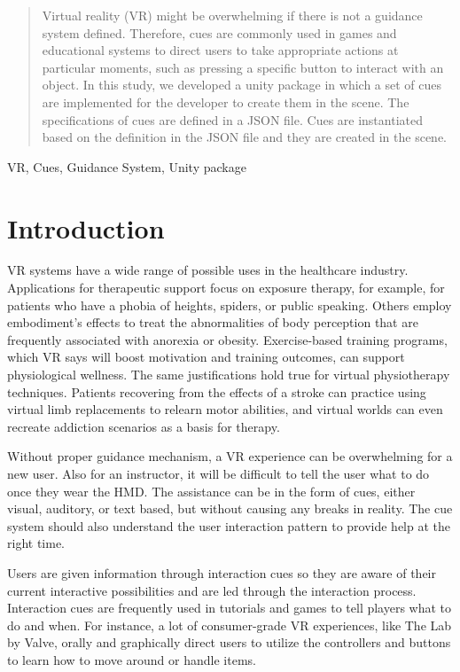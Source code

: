 \documentclass[conference]{IEEEtran}
\begin{document}
\begin{abstract}

Virtual reality (VR) might be overwhelming if there is not a guidance system defined. Therefore, cues are commonly used in games and educational systems to direct users to take appropriate actions at particular moments, such as pressing a specific button to interact with an object. In this study, we developed a unity package in which a set of cues are implemented for the developer to create them in the scene. The specifications of cues are defined in a JSON file. Cues are instantiated based on the definition in the JSON file and they are created in the scene. 


\end{abstract}

\begin{IEEEkeywords}
VR, Cues, Guidance System, Unity package
\end{IEEEkeywords}

\section{Introduction}

VR systems have a wide range of possible uses in the healthcare industry. Applications for therapeutic support focus on exposure therapy, for example, for patients who have a phobia of heights, spiders, or public speaking. Others employ embodiment's effects to treat the abnormalities of body perception that are frequently associated with anorexia or obesity. Exercise-based training programs, which VR says will boost motivation and training outcomes, can support physiological wellness. The same justifications hold true for virtual physiotherapy techniques. Patients recovering from the effects of a stroke can practice using virtual limb replacements to relearn motor abilities, and virtual worlds can even recreate addiction scenarios as a basis for therapy.

Without proper guidance mechanism, a VR experience can be overwhelming for a new user. Also for an instructor, it will be difficult to tell the user what to do once they wear the HMD. The assistance can be in the form of cues, either visual, auditory, or text based, but without causing any breaks in reality. The cue system should also understand the user interaction pattern to provide help at the right time.

Users are given information through interaction cues so they are aware of their current interactive possibilities and are led through the interaction process. Interaction cues are frequently used in tutorials and games to tell players what to do and when. For instance, a lot of consumer-grade VR experiences, like The Lab by Valve, orally and graphically direct users to utilize the controllers and buttons to learn how to move around or handle items. %
\end{document}
